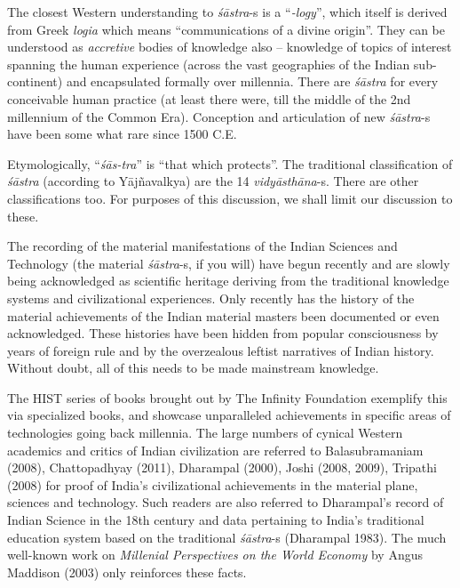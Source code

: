 The closest Western understanding to \textit{śāstra}-s is a “\textit{-logy}”, which itself is derived from Greek \textit{logia} which means “communications of a divine origin”. They can be understood as \textit{accretive} bodies of knowledge also – knowledge of topics of interest spanning the human experience (across the vast geographies of the Indian sub-continent) and encapsulated formally over millennia. There are \textit{śāstra} for every conceivable human practice (at least there were, till the middle of the 2nd millennium of the Common Era). Conception and articulation of new \textit{śāstra}-s have been some what rare since 1500 C.E.

Etymologically, “\textit{śās-tra}” is “that which protects”. The traditional classification of \textit{śāstra} (according to Yājñavalkya) are the 14 \textit{vidyāsthāna}-s. There are other classifications too. For purposes of this discussion, we shall limit our discussion to these.

The recording of the material manifestations of the Indian Sciences and Technology (the material \textit{śāstra}-s, if you will) have begun recently and are slowly being acknowledged as scientific heritage deriving from the traditional knowledge systems and civilizational experiences. Only recently has the history of the material achievements of the Indian material masters been documented or even acknowledged. These histories have been hidden from popular consciousness by years of foreign rule and by the overzealous leftist narratives of Indian history. Without doubt, all of this needs to be made mainstream knowledge.

The HIST series of books brought out by The Infinity Foundation exemplify this via specialized books, and showcase unparalleled achievements in specific areas of technologies going back millennia. The large numbers of cynical Western academics and critics of Indian civilization are referred to Balasubramaniam (2008), Chattopadhyay (2011), Dharampal (2000), Joshi (2008, 2009), Tripathi (2008) for proof of India’s civilizational achievements in the material plane, sciences and technology. Such readers are also referred to Dharampal’s record of Indian Science in the 18th century and data pertaining to India’s traditional education system based on the traditional \textit{śāstra}-s (Dharampal 1983). The much well-known work on \textit{Millenial Perspectives on the World Economy} by Angus Maddison (2003) only reinforces these facts.

